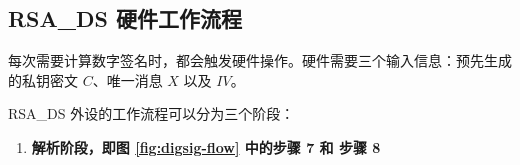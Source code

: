 \documentclass[main\_\_CN.tex]{subfiles}
\begin{document}
\subsection{RSA\_DS 硬件工作流程}
\label{sec:digsig-hardware-level-operation}

每次需要计算数字签名时，都会触发硬件操作。硬件需要三个输入信息：预先生成的私钥密文 \begin{math}C\end{math}、唯一消息 \begin{math}X\end{math} 以及 \begin{math}IV\end{math}。

RSA\_DS 外设的工作流程可以分为三个阶段：

\begin{enumerate}

    \item {\bfseries 解析阶段，即图 \ref{fig:digsig-flow} 中的步骤 7 和 步骤 8}


\end{enumerate}
\end{document}
